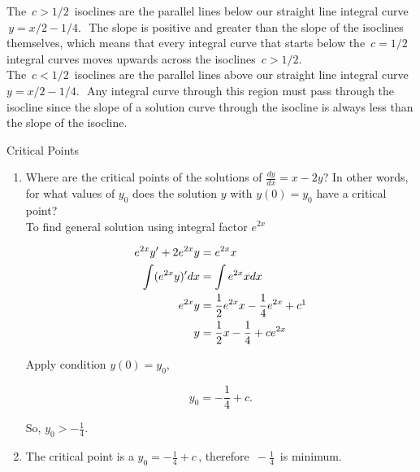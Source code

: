 The $\, c>1/2\,$ isoclines are the parallel lines below our straight line integral curve
$\, y=x/2 - 1/4.\, \,$
The slope is positive and greater than the slope of the isoclines themselves,
which means that every integral curve that starts below the $\, c=1/2\,$
integral curves moves upwards across the isoclines $\, c>1/2$. \\

The $\, c<1/2\,$ isoclines are the parallel lines above our straight line integral curve
$y=x/2 - 1/4.\, \,$
Any integral curve through this region must pass through the isocline
since the slope of a solution curve through the isocline is always less than the slope of the isocline.

\begin{problem}
  Critical Points
\end{problem}
\begin{enumerate}
\item Where are the critical points of the solutions of $\frac{dy}{dx}=x-2y$?
  In other words, for what values of $y_0$ does the solution $y$
  with $y(0)=y_0$ have a critical point? \\

  To find general solution using integral factor $e^{2x}$
  
  \begin{align*}
    e^{2x} y' + 2 e^{2x} y &=  e^{2x} x \\
    \int (e^{2x} y) ' dx &= \int e^{2x} x dx \\
    e^{2x} y &= \frac{1}{2} e^{2x} x  - \frac{1}{4} e^{2x} + c  \footnotemark \\
    y &= \frac{1}{2} x  - \frac{1}{4} + c e^{2x} \\
  \end{align*} 

  Apply condition $y(0)=y_0$,

  \begin{equation*}
    y _0 = - \frac{1}{4} + c. 
  \end{equation*}

  So, $ y _0 > - \frac{1}{4}.$
\item The critical point is a
  $y _0 = - \frac{1}{4} + c\,$, therefore $\, -\frac{1}{4} \,$ is minimum.  
\end{enumerate}

